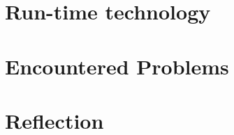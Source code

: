\documentclass[journal,10pt]{IEEEtran}
\begin{document}
\section{Run-time technology}


\section{Encountered Problems}\label{sec:challenges}


\section{Reflection}



  

\end{document}

